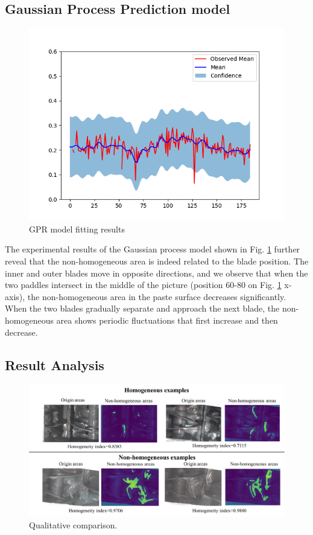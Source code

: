 \documentclass[pdflatex,sn-mathphys]{sn-jnl}%
\theoremstyle{thmstyleone}%
\theoremstyle{thmstyletwo}%
\theoremstyle{thmstylethree}%
\begin{document}
\subsection{Gaussian Process Prediction model}
\begin{figure}
    \centering
    \includegraphics[width=0.99\linewidth]{images/GP_result.png}
    \caption{GPR model fitting results}
    \label{fig:gpr}
\end{figure}

The experimental results of the Gaussian process model shown in Fig. \ref{fig:gpr} further reveal that the non-homogeneous area is indeed related to the blade position. The inner and outer blades move in opposite directions, and we observe that when the two paddles intersect in the middle of the picture (position 60-80 on Fig. \ref{fig:gpr} x-axis), the non-homogeneous area in the paste surface decreases significantly. 
When the two blades gradually separate and approach the next blade, the non-homogeneous area shows periodic fluctuations that first increase and then decrease.


\subsection{Result Analysis}
\begin{figure}
    \centering
    \includegraphics[width=0.98\linewidth]{images/qualitative_demonstration.PNG}
    \caption{Qualitative comparison.}
    \label{fig:qualitative_comparison}
\end{figure}
\end{document}
